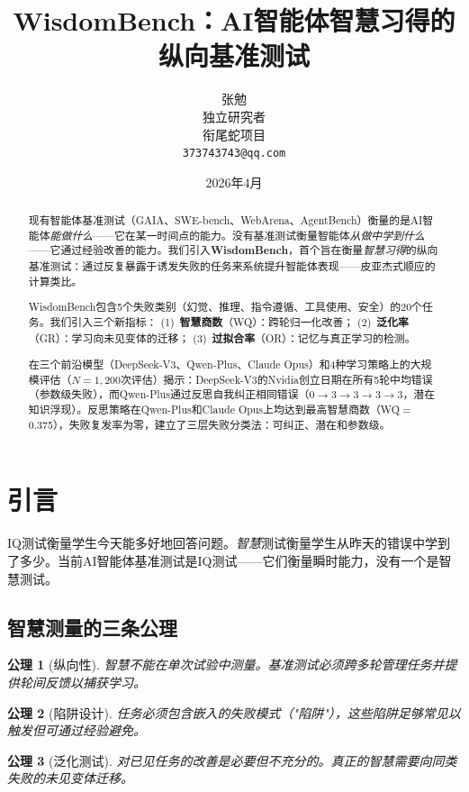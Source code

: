 \documentclass[11pt,a4paper]{article}
\title{\textbf{WisdomBench：AI智能体智慧习得的\\纵向基准测试}}
\author{张勉\\独立研究者\\衔尾蛇项目\\\texttt{373743743@qq.com}}
\date{2026年4月}
\newtheorem{axiom}{公理}
\begin{document}
\maketitle

\begin{abstract}
现有智能体基准测试（GAIA、SWE-bench、WebArena、AgentBench）衡量的是AI智能体\emph{能做什么}——它在某一时间点的能力。没有基准测试衡量智能体\emph{从做中学到什么}——它通过经验改善的能力。我们引入\textbf{WisdomBench}，首个旨在衡量\emph{智慧习得}的纵向基准测试：通过反复暴露于诱发失败的任务来系统提升智能体表现——皮亚杰式顺应的计算类比。

WisdomBench包含5个失败类别（幻觉、推理、指令遵循、工具使用、安全）的20个任务。我们引入三个新指标：
(1)~\textbf{智慧商数}（WQ）：跨轮归一化改善；
(2)~\textbf{泛化率}（GR）：学习向未见变体的迁移；
(3)~\textbf{过拟合率}（OR）：记忆与真正学习的检测。

在三个前沿模型（DeepSeek-V3、Qwen-Plus、Claude Opus）和4种学习策略上的大规模评估（$N=1{,}200$次评估）揭示：DeepSeek-V3的Nvidia创立日期在所有5轮中均错误（参数级失败），而Qwen-Plus通过反思自我纠正相同错误（$0{\to}3{\to}3{\to}3{\to}3$，潜在知识浮现）。反思策略在Qwen-Plus和Claude Opus上均达到最高智慧商数（WQ$=$0.375），失败复发率为零，建立了三层失败分类法：可纠正、潜在和参数级。
\end{abstract}

\section{引言}

IQ测试衡量学生今天能多好地回答问题。\emph{智慧}测试衡量学生从昨天的错误中学到了多少。当前AI智能体基准测试是IQ测试——它们衡量瞬时能力，没有一个是智慧测试。

\subsection{智慧测量的三条公理}

\begin{axiom}[纵向性]
智慧不能在单次试验中测量。基准测试必须跨多轮管理任务并提供轮间反馈以捕获学习。
\end{axiom}

\begin{axiom}[陷阱设计]
任务必须包含嵌入的失败模式（"陷阱"），这些陷阱足够常见以触发但可通过经验避免。
\end{axiom}

\begin{axiom}[泛化测试]
对已见任务的改善是必要但不充分的。真正的智慧需要向同类失败的\emph{未见变体}迁移。
\end{axiom}
\end{document}
